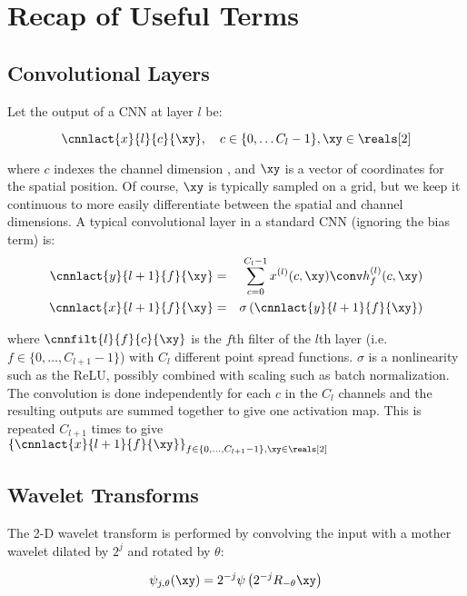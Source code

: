 \section{Recap of Useful Terms}\label{sec:ch5:background}

\subsection{Convolutional Layers}\label{sec:ch5:conv}

Let the output of a CNN at layer $l$ be:

$$ \cnnlact{x}{l}{c}{\xy}, \quad c\in \{0, \ldots C_l-1\}, \xy \in \reals[2]$$

where $c$ indexes the channel dimension , and $\xy$ is a vector of coordinates
for the spatial position. Of course, $\xy$ is typically sampled on a grid, but
we keep it continuous to more easily differentiate between the spatial and
channel dimensions. A typical convolutional layer in a standard CNN (ignoring
the bias term) is:
%
\begin{eqnarray} 
  \cnnlact{y}{l+1}{f}{\xy} &=& \sum_{c=0}^{C_l - 1}  x^{(l)}(c,\xy) \conv h^{(l)}_{f}(c, \xy)
    \label{eq:ch5:conv}\\
    \cnnlact{x}{l+1}{f}{\xy} & = & \sigma \left( \cnnlact{y}{l+1}{f}{\xy} \right) \label{eq:ch5:nonlin}
\end{eqnarray}

where $\cnnfilt{l}{f}{c}{\xy}$ is the $f$th filter of the $l$th layer (i.e. $f \in \{0,
\ldots, C_{l+1}-1 \}$) with $C_l$ different point spread functions. $\sigma$ is a nonlinearity 
such as the ReLU, possibly combined with scaling such as batch normalization. The convolution
is done independently for each $c$ in the $C_l$ channels and the resulting outputs are
summed together to give one activation map. This is repeated $C_{l+1}$ times to
give $\left\{ \cnnlact{x}{l+1}{f}{\xy} \right\}_{f \in \{0, \ldots, C_{l+1}-1 \}, \xy \in \reals[2]}$

\subsection{Wavelet Transforms}\label{sec:ch5:wavelets}
The 2-D wavelet transform is performed by convolving the input with a mother wavelet
dilated by $2^j$ and rotated by $\theta$:

\begin{equation}
  \psi_{j, \theta}(\xy) = 2^{-j}\psi \left(2^{-j} R_{-\theta} \xy\right)
\end{equation}

